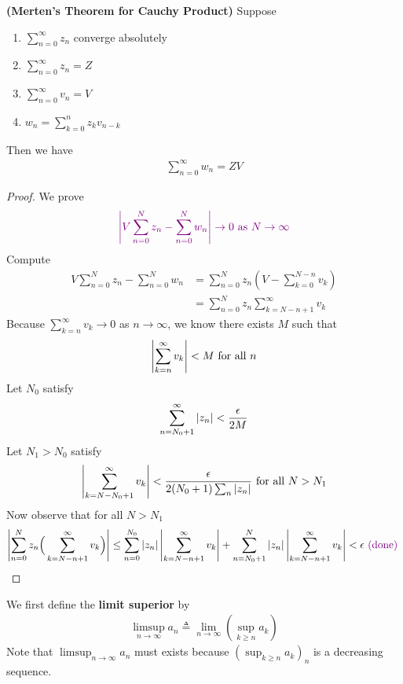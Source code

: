 \documentclass{report}
\begin{document}
\begin{theorem}
\label{Merten Cau}
\textbf{(Merten's Theorem for Cauchy Product)} Suppose 
\begin{enumerate}[label=(\alph*)]
  \item $\sum_{n=0}^\infty z_n$ converge absolutely 
  \item $\sum_{n=0}^\infty z_n=Z$
  \item $\sum_{n=0}^\infty v_n=V$ 
  \item $w_n=\sum_{k=0}^n z_kv_{n-k}$
\end{enumerate}
Then we have 
\begin{align*}
\sum_{n=0}^{\infty}w_n=ZV
\end{align*}
\end{theorem}
\begin{proof}
We prove 
\begin{align*}
  \textcolor{violet}{\left|V\sum_{n=0}^N z_n- \sum_{n=0}^Nw_n\right|\to 0\text{ as }N\to \infty}
\end{align*}
Compute 
\begin{align*}
V\sum_{n=0}^N z_n - \sum_{n=0}^N w_n&=\sum_{n=0}^N z_n (V-\sum_{k=0}^{N-n}v_k)\\
&=\sum_{n=0}^N z_n \sum_{k=N-n+1}^{\infty}v_k
\end{align*}
Because $\sum_{k=n}^{\infty}v_k\to 0$ as $n\to \infty$, we know there exists $M$ such that 
\begin{align*}
\label{me1}
\left|\sum_{k=n}^{\infty}v_k\right|<M\text{ for all }n
\end{align*}
Let $N_0$ satisfy 
 \begin{align*}
\sum_{n=N_0+1}^{\infty} \left|z_n\right|< \frac{\epsilon }{2M}
\end{align*}
Let $N_1>N_0$ satisfy 
 \begin{align*}
  \label{me2}
   \left|\sum_{k=N-N_0+1}^{\infty}v_k\right|<\frac{\epsilon}{2(N_0+1)\sum_n \left|z_n\right|} \text{ for all }N>N_1
\end{align*}
Now observe that for all $N>N_1$
\begin{align*}
  \left|\sum_{n=0}^N z_n \Big(\sum_{k=N-n+1}^\infty v_k \Big)\right|\leq \sum_{n=0}^{N_0} \left|z_n\right| \left|\sum_{k=N-n+1}^{\infty}v_k\right|+ \sum_{n=N_0+1}^{N} \left|z_n\right| \left|\sum_{k=N-n+1}^{\infty}v_k\right|<\epsilon \textcolor{violet}{\text{ (done) }} 
\end{align*}
\end{proof}
\begin{mdframed}
We first define the \textbf{limit superior} by 
\begin{align*}
\limsup_{n\to\infty} a_n\triangleq \lim_{n\to \infty} (\sup_{k\geq n}a_k)
\end{align*}
Note that $\limsup_{n\to\infty} a_n$ must exists because $(\sup_{k\geq n}a_k)_n$ is a decreasing sequence. 
\end{mdframed}
\end{document}
